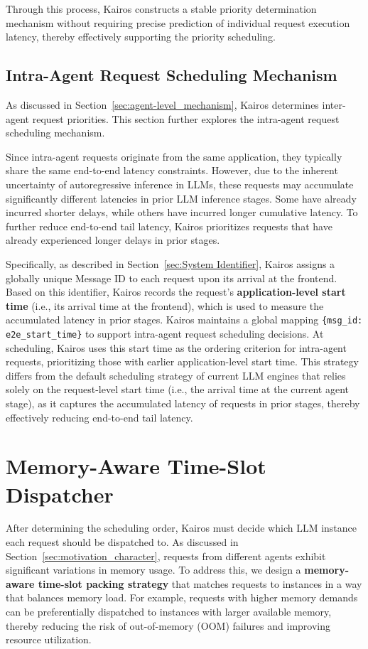 \documentclass[sigplan,nonacm]{acmart}
\newcommand{\system}{Kairos}
\begin{document}
Through this process, \system{} constructs a stable priority determination mechanism without requiring precise prediction of individual request execution latency, thereby effectively supporting the priority scheduling.



\subsection{Intra-Agent Request Scheduling Mechanism}
As discussed in Section~\ref{sec:agent-level_mechanism}, \system{} determines inter-agent request priorities. This section further explores the intra-agent request scheduling mechanism.

Since intra-agent requests originate from the same application, they typically share the same end-to-end latency constraints. However, due to the inherent uncertainty of autoregressive inference in LLMs, these requests may accumulate significantly different latencies in prior LLM inference stages. Some have already incurred shorter delays, while others have incurred longer cumulative latency. To further reduce end-to-end tail latency, \system{} prioritizes requests that have already experienced longer delays in prior stages.

Specifically, as described in Section~\ref{sec:System Identifier}, \system{} assigns a globally unique Message ID to each request upon its arrival at the frontend. Based on this identifier, \system{} records the request’s \textbf{application-level start time} (i.e., its arrival time at the frontend), which is used to measure the accumulated latency in prior stages. \system{} maintains a global mapping \texttt{\{msg\_id: e2e\_start\_time\}} to support intra-agent request scheduling decisions.
At scheduling, \system{} uses this start time as the ordering criterion for intra-agent requests, prioritizing those with earlier application-level start time. This strategy differs from the default scheduling strategy of current LLM engines that relies solely on the request-level start time (i.e., the arrival time at the current agent stage), as it captures the accumulated latency of requests in prior stages, thereby effectively reducing end-to-end tail latency.


\section{Memory-Aware Time-Slot Dispatcher}
\label{sec:Packing}
After determining the scheduling order, \system{} must decide which LLM instance each request should be dispatched to.
As discussed in Section~\ref{sec:motivation_character}, requests from different agents exhibit significant variations in memory usage.
To address this, we design a \textbf{memory-aware time-slot packing strategy} that matches requests to instances in a way that balances memory load. For example, requests with higher memory demands can be preferentially dispatched to instances with larger available memory, thereby reducing the risk of out-of-memory (OOM) failures and improving resource utilization.
\end{document}

